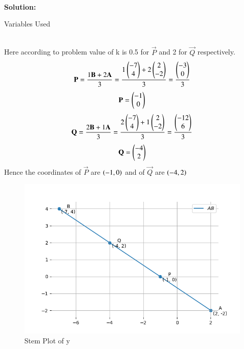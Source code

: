 \documentclass[journal]{IEEEtran}
\begin{document}
\hfill{}\\
\textbf{Solution: }
\begin{table}[h!]    
  \centering
  
  \caption{Variables Used}
  \label{tab10.5.3.9.1}
\end{table}\\
Here according to problem value of k is 0.5 for $\vec{P}$ and 2 for $\vec{Q}$ respectively.
\begin{align}
\mathbf{P}=\frac{1\mathbf{B}+2\mathbf{A}}{3}=\frac{1\begin{pmatrix}-7\\4\end{pmatrix}+2\begin{pmatrix}2\\-2\end{pmatrix}}{3}=\frac{\begin{pmatrix}-3\\0\end{pmatrix}}{3}
\end{align}
\begin{align}
\mathbf{P}=\begin{pmatrix}-1\\0\end{pmatrix}
\end{align}
\begin{align}
\mathbf{Q}=\frac{2\mathbf{B}+1\mathbf{A}}{3}=\frac{2\begin{pmatrix}-7\\4\end{pmatrix}+1\begin{pmatrix}2\\-2\end{pmatrix}}{3}=\frac{\begin{pmatrix}-12\\6\end{pmatrix}}{3}
\end{align}
\begin{align}
\mathbf{Q}=\begin{pmatrix}-4\\2\end{pmatrix}
\end{align}
Hence the coordinates of $\vec{P}$ are $\left(-1,0\right)$ and of $\vec{Q}$ are $\left(-4,2\right)$
\begin{figure}[h!]
   \centering
   \includegraphics[width=0.7\linewidth]{figs/Fig2.png}
   \caption{Stem Plot of y}
   \label{stemplot}
\end{figure}
\end{document}
